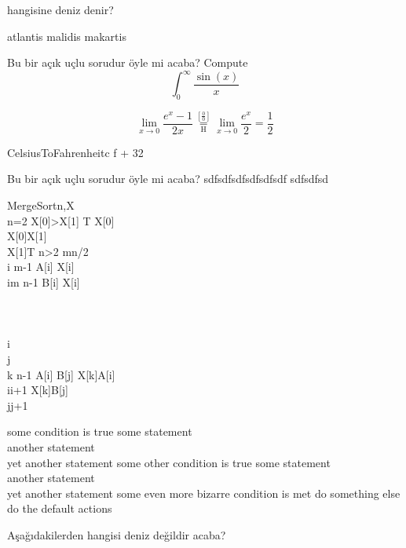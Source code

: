 \documentclass[addpoints]{exam}
\begin{document}
\lfoot{}\cfoot{}\begin{questions}
\question hangisine deniz denir?
\begin{checkboxes}
\choice atlantis
\choice malidis
\choice makartis
\end{checkboxes}
\question Bu bir açık uçlu sorudur öyle mi acaba?
\newline
Compute \[\int_{0}^{\infty} \frac{\sin(x)}{x}\]

\[
 \lim_{x\to 0}{\frac{e^x-1}{2x}}
 \overset{\left[\frac{0}{0}\right]}{\underset{\mathrm{H}}{=}}
 \lim_{x\to 0}{\frac{e^x}{2}}={\frac{1}{2}}
\]

\begin{pseudocode}{CelsiusToFahrenheit}{c}
f  + 32\\
\end{pseudocode}





\vspace{200mm}
\question Bu bir açık uçlu sorudur öyle mi acaba?
sdfsdfsdfsdfsdfsdf
sdfsdfsd

\renewcommand{\thepseudonum}{\roman{pseudonum}}
\begin{pseudocode}{MergeSort}{n,X}
\label{MergeSort}
\\
\IF n=2 \THEN
\BEGIN
\IF X[0]>X[1] \THEN
\BEGIN
T \GETS X[0]\\
X[0]\GETS X[1]\\
X[1]\GETS T
\END
\END
\ELSEIF n>2 \THEN
\BEGIN
m\GETS \lfloor n/2 \rfloor\\
\FOR i \TO m-1 \DO A[i] \GETS X[i]\\
\FOR i\GETS m \TO n-1 \DO B[i] \GETS X[i]\\
\\
\\
\\
i\\
j\\
\FOR k  \TO n-1 \DO
\BEGIN
\IF A[i] \leq B[j] \THEN
\BEGIN
X[k]\GETS A[i] \\
i\GETS i+1
\END
\ELSE
\BEGIN
X[k]\GETS B[j] \\
j\GETS j+1
\END
\END
\END
\end{pseudocode}

\begin{pseudocode}
\IF some condition is true
\THEN
\BEGIN
some statement\\
another statement\\
yet another statement
\END
\ELSEIF some other condition is true
\THEN
\BEGIN
some statement\\
another statement\\
yet another statement
\END
\ELSEIF some even more bizarre condition is met
\THEN
do something else
\ELSE
do the default actions
\end{pseudocode}
\newpage
\mbox{}
\newpage
\question Aşağıdakilerden hangisi deniz değildir acaba?


\end{questions}
\end{document}
